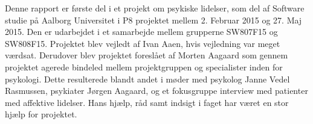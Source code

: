 Denne rapport er første del i et projekt om psykiske lidelser, som del af Software studie på Aalborg Universitet i P8 projektet mellem 2. Februar 2015 og 27. Maj 2015. 
Den er udarbejdet i et samarbejde mellem grupperne SW807F15 og SW808F15.
Projektet blev vejledt af Ivan Aaen, hvis vejledning var meget værdsat.
Derudover blev projektet foreslået af Morten Aagaard som gennem projektet agerede bindeled mellem projektgruppen og specialister inden for psykologi. Dette resulterede blandt andet i møder med psykolog Janne Vedel Rasmussen, psykiater Jørgen Aagaard, og et fokusgruppe interview med patienter med affektive lidelser. Hans hjælp, råd samt indsigt i faget har været en stor hjælp for projektet.